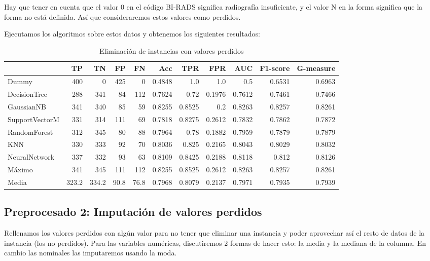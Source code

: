 \documentclass{article}
\begin{document}
Hay que tener en cuenta que el valor 0 en el código BI-RADS significa
radiografía insuficiente, y el valor N en la forma significa que la
forma no está definida. Así que consideraremos estos valores como
perdidos.

Ejecutamos los algoritmos sobre estos datos y obtenemos los siguientes
resultados:

\begin{table}[H]
\centering
\caption{Eliminación de instancias con valores perdidos}
\label{tab:dropna}
\begin{tabular}{|lrrrrrrrrrr|}
\hline
 & TP & TN & FP & FN & Acc & TPR & FPR & AUC & F1-score & G-measure\\ \hline
Dummy & 400 & 0 & 425 & 0 & 0.4848 & 1.0 & 1.0 & 0.5 & 0.6531 & 0.6963\\
DecisionTree & 288 & 341 & 84 & 112 & 0.7624 & 0.72 & 0.1976 & 0.7612 & 0.7461 & 0.7466\\
GaussianNB & 341 & 340 & 85 & 59 & 0.8255 & 0.8525 & 0.2 & 0.8263 & 0.8257 & 0.8261\\
SupportVectorM & 331 & 314 & 111 & 69 & 0.7818 & 0.8275 & 0.2612 & 0.7832 & 0.7862 & 0.7872\\
RandomForest & 312 & 345 & 80 & 88 & 0.7964 & 0.78 & 0.1882 & 0.7959 & 0.7879 & 0.7879\\
KNN & 330 & 333 & 92 & 70 & 0.8036 & 0.825 & 0.2165 & 0.8043 & 0.8029 & 0.8032\\
NeuralNetwork & 337 & 332 & 93 & 63 & 0.8109 & 0.8425 & 0.2188 & 0.8118 & 0.812 & 0.8126\\ \hline
Máximo & 341 & 345 & 111 & 112 & 0.8255 & 0.8525 & 0.2612 & 0.8263 & 0.8257 & 0.8261\\
Media & 323.2 & 334.2 & 90.8 & 76.8 & 0.7968 & 0.8079 & 0.2137 & 0.7971 & 0.7935 & 0.7939\\
\hline
\end{tabular}
\end{table}

\subsection{Preprocesado 2: Imputación de valores perdidos}

Rellenamos los valores perdidos con algún valor para no tener que
eliminar una instancia y poder aprovechar así el resto de datos de la
instancia (los no perdidos). Para las variables numéricas,
discutiremos 2 formas de hacer esto: la media y la mediana de la
columna. En cambio las nominales las imputaremos usando la moda.
\end{document}
